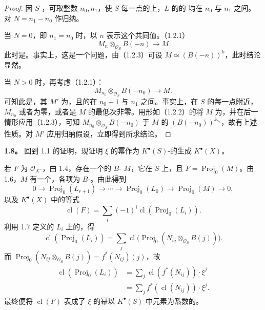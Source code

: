 \begin{proof}
因 $S$ ，可取整数 $n_0,n_1$，使 $S$ 每一点的上，$L$ 的的
均在 $n_0$ 与 $n_1$ 之间。对 $N=n_1-n_0$ 作归纳。

当 $N=0$，即 $n_1=n_0$ 时，以 $n$ 表示这个共同值。（1.2.1）
\[
M_n\otimes_{\mathcal O_S}B(-n)\longrightarrow M
\]
此时是。事实上，这是一个问题，由（1.2.3）可设 $M\simeq(B(-n))^k$，此时结论显然。

当 $N>0$ 时，再考虑（1.2.1）：
\[
M_{n_0}\otimes_{\mathcal O_S}B(-n_0)\longrightarrow M.
\]
可知此是，其 $M'$ 为，且的在 $n_0+1$ 与 $n_1$ 之间。事实上，在 $S$ 的每一点附近，$M_{n_0}$ 或者为零，或者是 $M$ 的最低次非零。用形如（1.2.2）的将 $M$ 为，并在后一情形应用（1.2.3），可知 $M_{n_0}\otimes_{\mathcal O_S}B(-n_0)$ 于 $M$ 的 $(B(-n_0))^{k_{n_0}}$，故有上述性质。对 $M'$ 应用归纳假设，立即得到所求结论。
\end{proof}
\textbf{1.8。} 回到 1.1 的证明，现证明 $\xi$ 的幂作为 $K^\bullet(S)$-的生成 $K^\bullet(X)$。

若 $F$ 为 $\mathcal O_X$-，由 1.4，存在一个的 $B$- $M$，它在 $S$ 上，且 $F=\operatorname{Proj}_0(M)$。由 1.6，$M$ 有一个，各项为 $B$-。由此得到
\[
0\longrightarrow\operatorname{Proj}_0(L_{r+1})\longrightarrow\cdots
\longrightarrow\operatorname{Proj}_0(L_0)\longrightarrow\operatorname{Proj}_0(M)\longrightarrow0,
\]
以及 $K^\bullet(X)$ 中的等式
\[
\operatorname{cl}(F)=\sum_i(-1)^i\operatorname{cl}(\operatorname{Proj}_0(L_i)).
\]
利用 1.7 定义的 $L_i$ 上的，得
\[
\operatorname{cl}(\operatorname{Proj}_0(L_i))
=\sum_j\operatorname{cl}\bigl(\operatorname{Proj}_0(N_{ij}\otimes_{\mathcal O_S}B(j))\bigr).
\]
而 $\operatorname{Proj}_0(N_{ij}\otimes_{\mathcal O_S}B(j))=f^*(N_{ij})(j)$，故
\[
\begin{aligned}
\operatorname{cl}(\operatorname{Proj}_0(L_i))
&=\sum_j\operatorname{cl}(f^*(N_{ij}))\cdot\xi^j\\
&=\sum_j f^*(\operatorname{cl}(N_{ij}))\cdot\xi^j.
\end{aligned}
\]
最终便将 $\operatorname{cl}(F)$ 表成了 $\xi$ 的幂以 $K^\bullet(S)$ 中元素为系数的。

